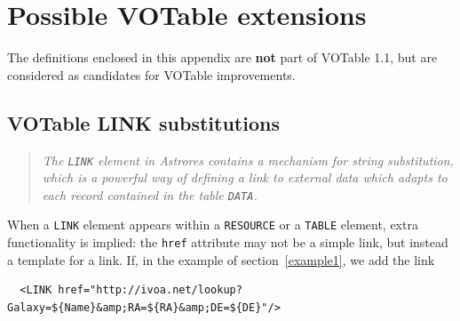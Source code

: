 \documentclass[11pt,a4paper]{ivoa}
\def\Aref#1{section~\ref{#1}}
\let\fg=\color
\def\attr#1{{\tt{\fg{DarkRed}#1}}}
\def\elem#1{{\tt{\fg{DarkRed}#1}}}
\begin{document}
{{{%




\clearpage
\appendix
{}

\bigskip

\section{Possible VOTable extensions}
The definitions enclosed in this appendix
are {\bf not} part of VOTable 1.1, but are considered as candidates
for VOTable improvements.


\subsection{VOTable LINK substitutions}
\label{LINK}

\begin{quote}\em \fg{DarkBlue}
  The \elem{LINK} element in Astrores \citep{astrores}
  contains a mechanism for string substitution,
  which is a powerful way of defining a link to external data
  which adapts to each record contained in the table \elem{DATA}.
\end{quote}

When a {\elem{LINK}} element appears within a \elem{RESOURCE} or a
{\elem{TABLE}} element,
extra functionality is implied: the {\attr{href}}
attribute may not be a simple link, but instead
a template for a link. If, in the  example of
\Aref{example1}, we add the link

\begin{verbatim}
  <LINK href="http://ivoa.net/lookup?Galaxy=${Name}&amp;RA=${RA}&amp;DE=${DE}"/>
\end{verbatim}

}}}
\end{document}
